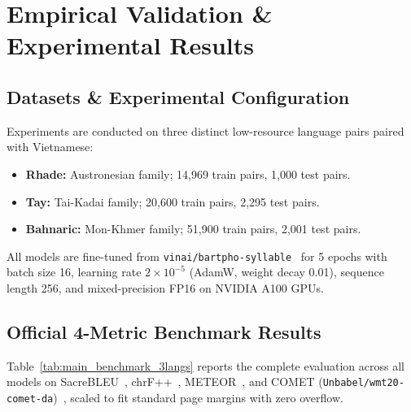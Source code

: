 \documentclass[11pt,a4paper]{article}
\begin{document}
\section{Empirical Validation \& Experimental Results}
\label{sec:experimental_results}

\subsection{Datasets \& Experimental Configuration}
Experiments are conducted on three distinct low-resource language pairs paired with Vietnamese:
\begin{itemize}[leftmargin=*]
    \item \textbf{Rhade:} Austronesian family; 14,969 train pairs, 1,000 test pairs.
    \item \textbf{Tay:} Tai-Kadai family; 20,600 train pairs, 2,295 test pairs.
    \item \textbf{Bahnaric:} Mon-Khmer family; 51,900 train pairs, 2,001 test pairs.
\end{itemize}

All models are fine-tuned from \texttt{vinai/bartpho-syllable}~\cite{tran2021bartpho} for 5 epochs with batch size 16, learning rate $2\times 10^{-5}$ (AdamW, weight decay 0.01), sequence length 256, and mixed-precision FP16 on NVIDIA A100 GPUs.

\subsection{Official 4-Metric Benchmark Results}

Table~\ref{tab:main_benchmark_3langs} reports the complete evaluation across all models on SacreBLEU~\cite{post2018call}, chrF++~\cite{popovic2015chrf}, METEOR~\cite{banerjee2005meteor}, and COMET (\texttt{Unbabel/wmt20-comet-da})~\cite{rei2020comet}, scaled to fit standard page margins with zero overflow.
\end{document}
